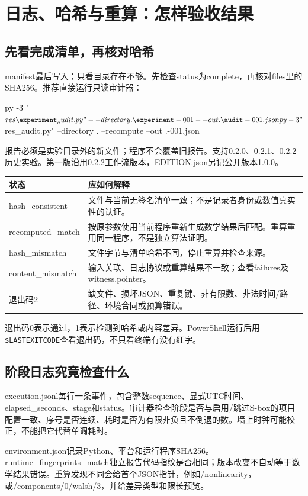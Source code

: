 \documentclass[UTF8,fontset=fandol,zihao=-4]{ctexrep}
\begin{document}
\chapter{日志、哈希与重算：怎样验收结果}
\section{先看完成清单，再核对哈希}
manifest最后写入；只看目录存在不够。先检查status为complete，再核对files里的SHA256。推荐直接运行只读审计器：
\begin{code}
py -3 "$res\experiment_audit.py" --directory .\experiment-001 --out .\audit-001.json
py -3 "$res\experiment_audit.py" --directory . --recompute --out .\replay-001.json
\end{code}
报告必须是实验目录外的新文件；程序不会覆盖旧报告。支持0.2.0、0.2.1、0.2.2历史实验。第一版沿用0.2.2工作流版本，EDITION.json另记公开版本1.0.0。

\begin{longtable}{p{40mm}p{105mm}}
\toprule 状态 & 应如何解释\\\midrule\endhead
hash\_consistent & 文件与当前无签名清单一致；不是记录者身份或数值真实性的认证。\\
recomputed\_match & 按原参数使用当前程序重新生成数学结果后匹配。重算重用同一程序，不是独立算法证明。\\
hash\_mismatch & 文件字节与清单哈希不同，停止重算并检查来源。\\
content\_mismatch & 输入关联、日志协议或重算结果不一致；查看failures及witness.pointer。\\
退出码2 & 缺文件、损坏JSON、重复键、非有限数、非法时间/路径、环境合同或预算错误。\\\bottomrule
\end{longtable}
退出码0表示通过，1表示检测到哈希或内容差异。PowerShell运行后用\texttt{\$LASTEXITCODE}查看退出码，不只看终端有没有红字。

\section{阶段日志究竟检查什么}
execution.jsonl每行一条事件，包含整数sequence、显式UTC时间、elapsed\_seconds、stage和status。审计器检查阶段是否与启用/跳过S-box的项目配置一致、序号是否连续、耗时是否为有限非负且不倒退的数。墙上时钟可能校正，不能把它代替单调耗时。

environment.json记录Python、平台和运行程序SHA256。runtime\_fingerprints\_match独立报告代码指纹是否相同；版本改变不自动等于数学结果错误。重算发现不同会给首个JSON指针，例如/nonlinearity，或/components/0/walsh/3，并给差异类型和限长预览。
\end{document}
